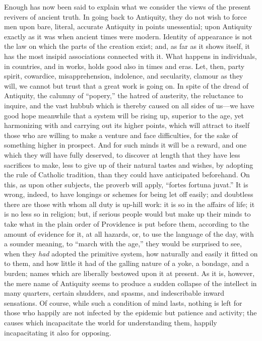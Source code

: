 Enough has now been said to explain what we consider
the views of the present revivers of ancient truth. In going back to
Antiquity, they do not wish to force men upon bare, literal, accurate
Antiquity in points unessential; upon Antiquity exactly as it was when
ancient times were modern. Identity of appearance is not the law on
which the parts of the creation exist; and, as far as it shows itself,
it has the most insipid associations connected with it. What happens
in individuals, in countries, and in works, holds good also in times
and eras. Let, then, party spirit, cowardice, misapprehension, indolence, and secularity, clamour as they will, we cannot but trust
that a great work is going on. In spite of the dread of Antiquity, the
calumny of ``popery,'' the hatred of austerity, the reluctance to
inquire, and the vast hubbub which is thereby caused on all sides of
us—we have good hope meanwhile that a system will be rising up,
superior to the age, yet harmonizing with and carrying out its higher
points, which will attract to itself those who are willing to make a
venture and face difficulties, for the sake of something higher in
prospect. And for such minds it will be a reward, and one which they
will have fully deserved, to discover at length that they have less
sacrifices to make, less to give up of their natural tastes and
wishes, by adopting the rule of Catholic tradition, than they could
have anticipated beforehand. On this, as upon other subjects, the
proverb will apply, ``fortes fortuna juvat.'' It is wrong, indeed, to
have longings or schemes for being let off easily; and doubtless there
are those with whom all duty is up-hill work: it is so in the affairs
of life; it is no less so in religion; but, if serious people would
but make up their minds to take what in the plain order of Providence
is put before them, according to the amount of evidence for it, at all
hazards, or, to use the language of the day, with a sounder meaning,
to ``march with the age,'' they would be surprised to see, when they \emph{had}
adopted the primitive system, how naturally and easily it fitted on to
them, and how little it had of the galling nature of a yoke, a
bondage, and a burden; names which are liberally bestowed upon it at
present. As it is, however, the mere name of Antiquity seems to
produce a sudden collapse of the intellect in many quarters, certain
shudders, and spasms, and indescribable inward sensations. Of course,
while such a condition of mind lasts, nothing is left for those
who happily are not infected by the epidemic but patience and
activity; the causes which incapacitate the world for understanding
them, happily incapacitating it also for opposing.

